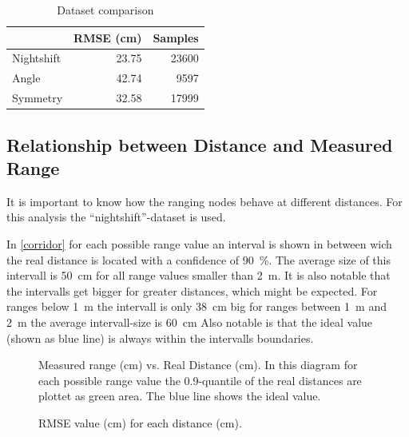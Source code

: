 \begin{table}[h]
	\centering	
	\begin{tabular}{l | r | r}
	           & RMSE (cm) & Samples \\ \hline
	Nightshift & 23.75     & 23600   \\ 
	Angle      & 42.74     & 9597    \\
	Symmetry   & 32.58     & 17999   \\
	
	\end{tabular}

	\caption{Dataset comparison}
	\label{datasets}
	
\end{table}

\subsection{Relationship between Distance and Measured Range}

It is important to know how the ranging nodes behave at different distances.
For this analysis the \enquote{nightshift}-dataset is used.

In \autoref{corridor} for each possible range value an interval is shown in between wich the real distance is located with a confidence of \SI{90}{\percent}.
The average size of this intervall is \SI{50}{cm} for all range values smaller than \SI{2}{m}.
It is also notable that the intervalls get bigger for greater distances, which might be expected.
For ranges below \SI{1}{m} the intervall is only \SI{38}{cm} big for ranges between \SI{1}{m} and \SI{2}{m} the average intervall-size is \SI{60}{cm}
Also notable is that the ideal value (shown as blue line) is always within the intervalls boundaries.

\begin{figure}[h]
	\centering
	
	\caption[ Measured range vs. Real Distance ]{Measured range (cm) vs. Real Distance (cm). In this diagram for each possible range value the 0.9-quantile of the real distances are plottet as green area. The blue line shows the ideal value.}
	\label{corridor}
\end{figure}

\begin{figure}[h]
	\centering
	
	\caption[ RMSE over distance ]{RMSE value (cm) for each distance (cm).}
	\label{corridor}
\end{figure}



